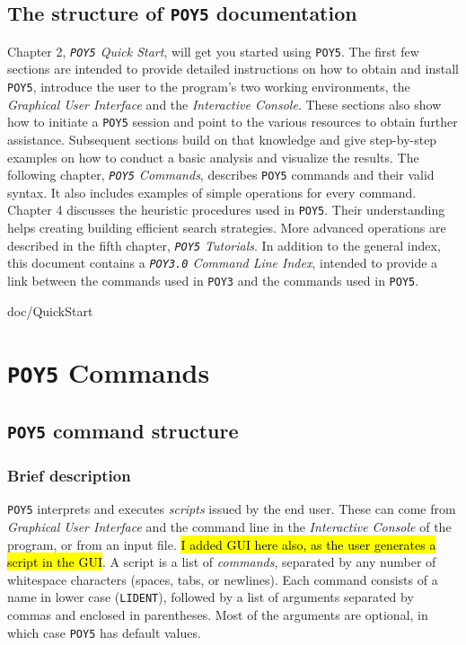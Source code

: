 \documentclass[11pt]{book}
\newcommand{\commandstyle}[1]{\texttt{#1}}
\newcommand{\poylident}{\commandstyle{LIDENT}\xspace}
\newcommand{\poy}{\commandstyle{POY5}\xspace}
\begin{document}
\section{The structure of \poy documentation}
Chapter 2, \emph{\poy Quick Start}, will get you started using \poy. The first few sections are intended to provide detailed instructions on how to obtain and install \poy, introduce the user to the program's two working environments, the \emph{Graphical User Interface} and the \emph{Interactive Console}. These sections also show how to initiate a \poy session and point to the various resources to obtain further assistance. Subsequent sections build on that knowledge and give step-by-step examples on how to conduct a basic analysis and visualize the results. The following chapter, \emph{\poy Commands}, describes \poy commands and their valid syntax. It also includes examples of simple operations for every command. Chapter 4 discusses the heuristic procedures used in \poy. Their understanding helps creating building efficient search strategies. More advanced operations are described in the fifth chapter, \emph{\poy Tutorials}. In addition to the general index, this document contains a \emph{\texttt{POY3.0} Command Line Index}, intended to provide a link between the commands used in \texttt{POY3} and the commands used in \poy. 


 {doc/QuickStart}

\chapter{\poy Commands}\label{commands}

\section{\poy command structure}

\subsection{Brief description} \label{commands}

\poy interprets and executes \emph{scripts} issued by the end user.  These can
come from \emph{Graphical User Interface} and the command line in the \emph{Interactive Console} of the program, or from an
input file. \hl{I added GUI here also, as the user generates a script in the GUI}. A script is a list of \emph{commands}, separated by any number of whitespace characters (spaces, tabs, or newlines). Each command consists of a name in lower case (\poylident), followed by a list of arguments separated by commas and enclosed in parentheses. Most of the arguments are optional, in
which case \poy has default values.
\end{document}
